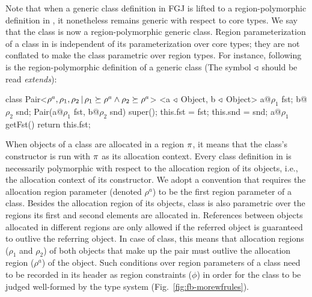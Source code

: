 Note that when a generic class definition in FGJ is lifted to a
region-polymorphic definition in \FB, it nonetheless remains generic
with respect to core types. We say that the class is now a
region-polymorphic generic class. Region parameterization of a class
in \FB is independent of its parameterization over core types; they
are not conflated to make the class parametric over region types. For
instance, following is the region-polymorphic definition of a generic
 class (The symbol $\triangleleft$ should be read \emph{extends}):
\begin{codejava}[mathescape=true]
class Pair<$\rho^a, \rho_1, \rho_2 \,|\, \rho_1 \succeq \rho^a 
                      \wedge \rho_2 \succeq \rho^a$>
          <a $\triangleleft$ Object, b $\triangleleft$ Object> {
  a@$\rho_1$ fst; 
  b@$\rho_2$ snd;
  Pair(a@$\rho_1$ fst, b@$\rho_2$ snd) {
    super(); 
    this.fst = fst; 
    this.snd = snd;
  }
  a@$\rho_1$ getFst() {
    return this.fst;
  }
}
\end{codejava}
When objects of a class are allocated in a region $\pi$, it means
that the class's constructor is run with $\pi$ as its allocation
context. Every class definition in \FB is necessarily polymorphic with
respect to the allocation region of its objects, i.e., the allocation
context of its constructor. We adopt a convention that requires the
allocation region parameter (denoted $\rho^a$) to be the first region
parameter of a class.  Besides the allocation region of its objects,
 class is also parametric over the regions its first and
second elements are allocated in. References between objects allocated
in different regions are only allowed if the referred object is
guaranteed to outlive the referring object. In case of  class,
this means that allocation regions ($\rho_1$ and $\rho_2$) of both
objects that make up the pair must outlive the allocation region
($\rho^a$) of the  object. Such conditions over region
parameters of a class need to be recorded in its header as region
constraints ($\phi$) in order for the class to be judged well-formed
by the type system (Fig.~\ref{fig:fb-morewfrules}). 

